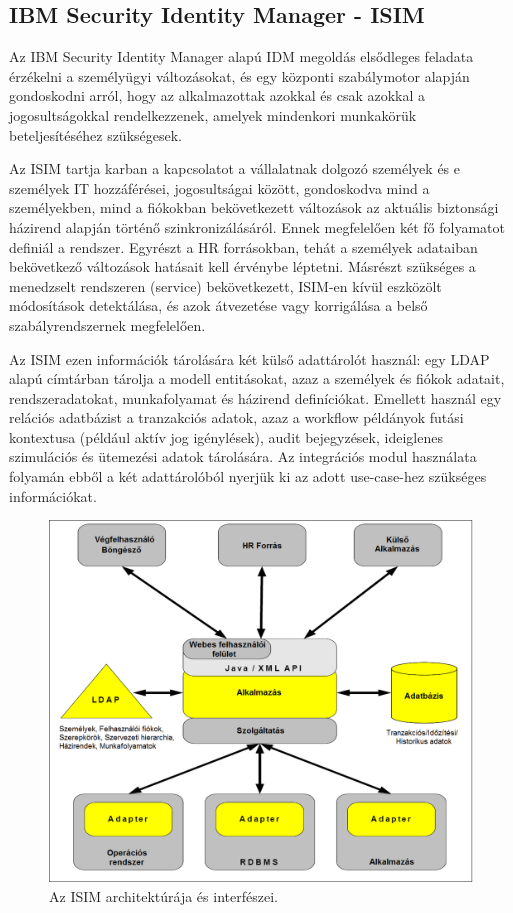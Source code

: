 \subsection{IBM Security Identity Manager - ISIM}
\label{subsec:ISIM}
Az IBM Security Identity Manager alapú IDM megoldás elsődleges feladata érzékelni a személyügyi változásokat, és egy központi szabálymotor alapján gondoskodni arról, hogy az alkalmazottak azokkal és csak azokkal a jogosultságokkal rendelkezzenek, amelyek mindenkori munkakörük beteljesítéséhez szükségesek.\cite{isimdoc}

Az ISIM tartja karban a kapcsolatot a vállalatnak dolgozó személyek és e személyek IT hozzáférései, jogosultságai között, gondoskodva mind a személyekben, mind a fiókokban bekövetkezett változások az aktuális biztonsági házirend alapján történő szinkronizálásáról. Ennek megfelelően két fő folyamatot definiál a rendszer.
Egyrészt a HR forrásokban, tehát a személyek adataiban bekövetkező változások hatásait kell érvénybe léptetni. Másrészt szükséges a menedzselt rendszeren (service) bekövetkezett, ISIM-en kívül eszközölt módosítások detektálása, és azok átvezetése vagy korrigálása a belső szabályrendszernek megfelelően. 

Az ISIM ezen információk tárolására két külső adattárolót használ: egy LDAP alapú címtárban tárolja a modell entitásokat, azaz a személyek és fiókok adatait, rendszeradatokat, munkafolyamat és házirend definíciókat. Emellett használ egy relációs adatbázist a tranzakciós adatok, azaz a workflow példányok futási kontextusa (például aktív jog igénylések), audit bejegyzések, ideiglenes szimulációs és ütemezési adatok tárolására. Az integrációs modul használata folyamán ebből a két adattárolóból nyerjük ki az adott use-case-hez szükséges információkat.

\begin{figure}
	\centering
	\includegraphics[width=0.5\linewidth]{figures/ISIM_promo.png}
	\caption{Az ISIM architektúrája és interfészei.}
	\label{fig:isim-promo}
\end{figure}


